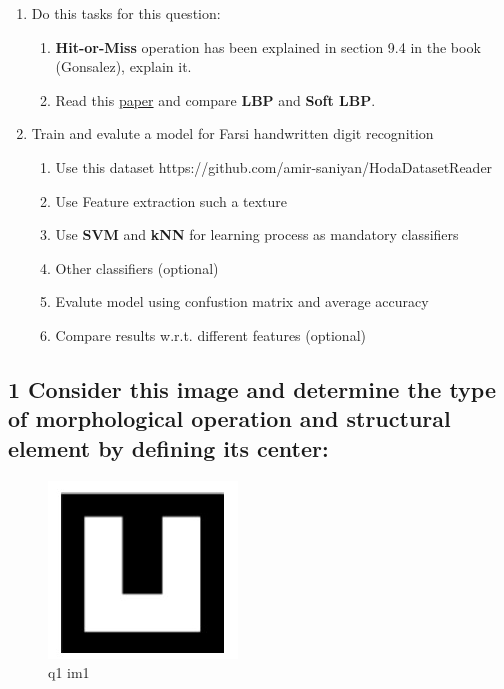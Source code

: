 \documentclass[11pt]{article}
\makeatletter
\def\maxwidth{\ifdim\Gin@nat@width>\linewidth\linewidth
    \else\Gin@nat@width\fi}
\let\Oldincludegraphics\includegraphics
\renewcommand{\includegraphics}[1]{\Oldincludegraphics[width=.8\maxwidth]{#1}}
\providecommand{\tightlist}{%
      \setlength{\itemsep}{0pt}\setlength{\parskip}{0pt}}
\makeatother
\begin{document}
\begin{enumerate}
\def\labelenumi{\arabic{enumi}.}
\setcounter{enumi}{2}
\tightlist
\item
  Do this tasks for this question:

  \begin{enumerate}
  \def\labelenumii{\arabic{enumii}.}
  \tightlist
  \item
    \textbf{Hit-or-Miss} operation has been explained in section 9.4 in
    the book (Gonsalez), explain it.
  \item
    Read this
    \href{http://www.ee.oulu.fi/research/mvmp/mvg/files/pdf/ahonen_soft_histograms_for_local_binary_patterns.pdf}{paper}
    and compare \textbf{LBP} and \textbf{Soft LBP}.
  \end{enumerate}
\item
  Train and evalute a model for Farsi handwritten digit recognition

  \begin{enumerate}
  \def\labelenumii{\arabic{enumii}.}
  \tightlist
  \item
    Use this dataset https://github.com/amir-saniyan/HodaDatasetReader
  \item
    Use Feature extraction such a texture
  \item
    Use \textbf{SVM} and \textbf{kNN} for learning process as mandatory
    classifiers
  \item
    Other classifiers (optional)
  \item
    Evalute model using confustion matrix and average accuracy
  \item
    Compare results w.r.t. different features (optional)
  \end{enumerate}
\end{enumerate}

    \hypertarget{consider-this-image-and-determine-the-type-of-morphological-operation-and-structural-element-by-defining-its-center}{%
\subsection{1 Consider this image and determine the type of
morphological operation and structural element by defining its
center:}\label{consider-this-image-and-determine-the-type-of-morphological-operation-and-structural-element-by-defining-its-center}}

\begin{figure}
\centering
\includegraphics{wiki/1_1.jpg}
\caption{q1 im1}
\end{figure}
\end{document}
